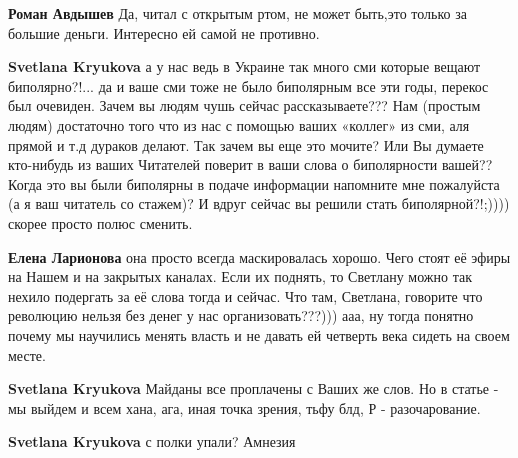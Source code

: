 \begin{itemize}
\begin{itemize}
\textbf{Роман Авдышев} Да, читал с открытым ртом, не может быть,это только за большие деньги. Интересно ей самой не противно.

 
\textbf{Svetlana Kryukova} а у нас ведь в Украине так много сми которые вещают биполярно?!... да и ваше сми тоже не было биполярным все эти годы, перекос был очевиден. Зачем вы людям чушь сейчас рассказываете??? Нам (простым людям) достаточно того что из нас с помощью ваших «коллег» из сми, аля прямой и т.д дураков делают. Так зачем вы еще это мочите? Или Вы думаете кто-нибудь из ваших Читателей поверит в ваши слова о биполярности вашей?? Когда это вы были биполярны в подаче информации напомните мне пожалуйста (а я ваш читатель со стажем)? И вдруг сейчас вы решили стать биполярной?!;)))) скорее просто полюс сменить.

 
\textbf{Елена Ларионова} она просто всегда маскировалась хорошо. Чего стоят её эфиры на Нашем и на закрытых каналах. Если их поднять, то Светлану можно так нехило подергать за её слова тогда и сейчас. Что там, Светлана, говорите что революцию нельзя без денег у нас организовать???))) ааа, ну тогда понятно почему мы научились менять власть и не давать ей четверть века сидеть на своем месте.

 
\textbf{Svetlana Kryukova} Майданы все проплачены с Ваших же слов. Но в статье - мы выйдем и всем хана, ага, иная точка зрения, тьфу блд, Р - разочарование.

 
\textbf{Svetlana Kryukova} с полки упали? Амнезия


\end{itemize}
\end{itemize}
